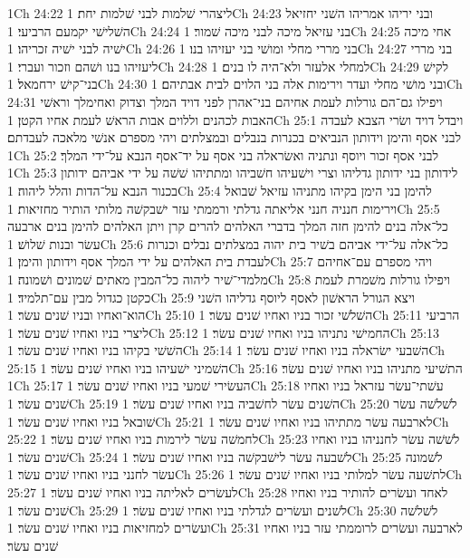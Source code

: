 1Ch 24:22  ליצהרי שׁלמות לבני שׁלמות יחת׃
1Ch 24:23  ובני יריהו אמריהו השׁני יחזיאל השׁלישׁי יקמעם הרביעי׃
1Ch 24:24  בני עזיאל מיכה לבני מיכה שׁמור׃
1Ch 24:25  אחי מיכה ישׁיה לבני ישׁיה זכריהו׃
1Ch 24:26  בני מררי מחלי ומושׁי בני יעזיהו בנו׃
1Ch 24:27  בני מררי ליעזיהו בנו ושׁהם וזכור ועברי׃
1Ch 24:28  למחלי אלעזר ולא־היה לו בנים׃
1Ch 24:29  לקישׁ בני־קישׁ ירחמאל׃
1Ch 24:30  ובני מושׁי מחלי ועדר וירימות אלה בני הלוים לבית אבתיהם׃
1Ch 24:31  ויפילו גם־הם גורלות לעמת אחיהם בני־אהרן לפני דויד המלך וצדוק ואחימלך וראשׁי האבות לכהנים וללוים אבות הראשׁ לעמת אחיו הקטן׃
1Ch 25:1  ויבדל דויד ושׂרי הצבא לעבדה לבני אסף והימן וידותון הנביאים בכנרות בנבלים ובמצלתים ויהי מספרם אנשׁי מלאכה לעבדתם׃
1Ch 25:2  לבני אסף זכור ויוסף ונתניה ואשׂראלה בני אסף על יד־אסף הנבא על־ידי המלך׃
1Ch 25:3  לידותון בני ידותון גדליהו וצרי וישׁעיהו חשׁביהו ומתתיהו שׁשׁה על ידי אביהם ידותון בכנור הנבא על־הדות והלל ליהוה׃
1Ch 25:4  להימן בני הימן בקיהו מתניהו עזיאל שׁבואל וירימות חנניה חנני אליאתה גדלתי ורממתי עזר ישׁבקשׁה מלותי הותיר מחזיאות׃
1Ch 25:5  כל־אלה בנים להימן חזה המלך בדברי האלהים להרים קרן ויתן האלהים להימן בנים ארבעה עשׂר ובנות שׁלושׁ׃
1Ch 25:6  כל־אלה על־ידי אביהם בשׁיר בית יהוה במצלתים נבלים וכנרות לעבדת בית האלהים על ידי המלך אסף וידותון והימן׃
1Ch 25:7  ויהי מספרם עם־אחיהם מלמדי־שׁיר ליהוה כל־המבין מאתים שׁמונים ושׁמונה׃
1Ch 25:8  ויפילו גורלות משׁמרת לעמת כקטן כגדול מבין עם־תלמיד׃
1Ch 25:9  ויצא הגורל הראשׁון לאסף ליוסף גדליהו השׁני הוא־ואחיו ובניו שׁנים עשׂר׃
1Ch 25:10  השׁלשׁי זכור בניו ואחיו שׁנים עשׂר׃
1Ch 25:11  הרביעי ליצרי בניו ואחיו שׁנים עשׂר׃
1Ch 25:12  החמישׁי נתניהו בניו ואחיו שׁנים עשׂר׃
1Ch 25:13  השׁשׁי בקיהו בניו ואחיו שׁנים עשׂר׃
1Ch 25:14  השׁבעי ישׂראלה בניו ואחיו שׁנים עשׂר׃
1Ch 25:15  השׁמיני ישׁעיהו בניו ואחיו שׁנים עשׂר׃
1Ch 25:16  התשׁיעי מתניהו בניו ואחיו שׁנים עשׂר׃
1Ch 25:17  העשׂירי שׁמעי בניו ואחיו שׁנים עשׂר׃
1Ch 25:18  עשׁתי־עשׂר עזראל בניו ואחיו שׁנים עשׂר׃
1Ch 25:19  השׁנים עשׂר לחשׁביה בניו ואחיו שׁנים עשׂר׃
1Ch 25:20  לשׁלשׁה עשׂר שׁובאל בניו ואחיו שׁנים עשׂר׃
1Ch 25:21  לארבעה עשׂר מתתיהו בניו ואחיו שׁנים עשׂר׃
1Ch 25:22  לחמשׁה עשׂר לירמות בניו ואחיו שׁנים עשׂר׃
1Ch 25:23  לשׁשׁה עשׂר לחנניהו בניו ואחיו שׁנים עשׂר׃
1Ch 25:24  לשׁבעה עשׂר לישׁבקשׁה בניו ואחיו שׁנים עשׂר׃
1Ch 25:25  לשׁמונה עשׂר לחנני בניו ואחיו שׁנים עשׂר׃
1Ch 25:26  לתשׁעה עשׂר למלותי בניו ואחיו שׁנים עשׂר׃
1Ch 25:27  לעשׂרים לאליתה בניו ואחיו שׁנים עשׂר׃
1Ch 25:28  לאחד ועשׂרים להותיר בניו ואחיו שׁנים עשׂר׃
1Ch 25:29  לשׁנים ועשׂרים לגדלתי בניו ואחיו שׁנים עשׂר׃
1Ch 25:30  לשׁלשׁה ועשׂרים למחזיאות בניו ואחיו שׁנים עשׂר׃
1Ch 25:31  לארבעה ועשׂרים לרוממתי עזר בניו ואחיו שׁנים עשׂר׃
